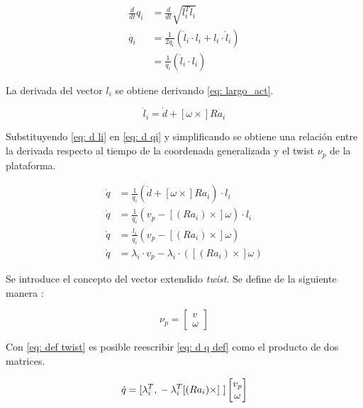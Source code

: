 \begin{equation} \label{eq: d qi}
\begin{split}
\frac{d}{dt}q_i & = \frac{d}{dt}\sqrt{  l_i^T    l_i}  \\
\dot{q_i} & = \frac{1}{2q_i} ( {\dot l_i} \cdot   l_i +   l_i \cdot  {\dot l_i})\\
 &= \frac{1}{q_i} ( {\dot l_i} \cdot   l_i)
\end{split}
\end{equation}

La derivada del vector $  l_i$ se obtiene derivando
\eqref{eq: largo_act}.

\begin{equation}\label{eq: d li}
  {\dot l_i} =  {\dot d} + [  \omega \times] R  a_i
\end{equation}

Substituyendo \eqref{eq: d li} en \eqref{eq: d qi} y 
simplificando se obtiene una relación entre
la derivada respecto al tiempo de la coordenada generalizada 
y el twist  $\nu_p$ de la plataforma.

\begin{equation}\label{eq: d q def}
 \begin{split}
    \dot q  & =\frac{1}{q_i}( {\dot{d}} + [  \omega \times] R   a_i)\cdot   l_i   \\
    \dot q        & = \frac{1}{q_i}(  v_p - [(Ra_i)\times]\omega)\cdot l_i\\
    \dot q        & = \frac{l_i}{q_i}\left(   v_p - [(Ra_i)\times]\omega \right) \\
    \dot q        & =  \lambda_i \cdot   v_p - \lambda_i \cdot ([(Ra_i)\times] \omega)
 \end{split}
\end{equation}

Se introduce el concepto del vector extendido \emph{twist}. 
Se define de la siguiente manera \cite{olguin20183d}:

\begin{equation}\label{eq: def twist}
 \nu_p = \begin{bmatrix}
          v \\
          \omega
      \end{bmatrix}
\end{equation}

Con \eqref{eq: def twist} es posible 
reescribir \eqref{eq: d q def} como el producto de dos 
matrices.

\begin{equation} \label{eq: jac_inv}
\dot{q} = [\lambda_i^T, \\ -\lambda_i^T [(Ra_i)\times]\ ] \begin{bmatrix}
v_p\\
\omega
\end{bmatrix}
\end{equation}

